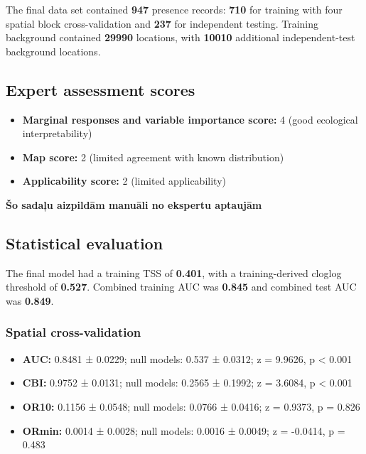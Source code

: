 \documentclass[
  openany]{book}
\providecommand{\tightlist}{%
  \setlength{\itemsep}{0pt}\setlength{\parskip}{0pt}}
\providecommand{\tightlist}{%
  \setlength{\itemsep}{0pt}%
  \setlength{\parskip}{0pt}%
}
\begin{document}
The final data set contained \textbf{947} presence records: \textbf{710} for training with four spatial block cross-validation and \textbf{237} for independent testing. Training background contained \textbf{29990} locations, with \textbf{10010} additional independent-test background locations.

\subsection*{Expert assessment scores}\label{expert-assessment-scores-11}

\begin{itemize}
\tightlist
\item
  \textbf{Marginal responses and variable importance score:} 4 (good ecological interpretability)
\item
  \textbf{Map score:} 2 (limited agreement with known distribution)
\item
  \textbf{Applicability score:} 2 (limited applicability)
\end{itemize}

\textbf{Šo sadaļu aizpildām manuāli no ekspertu aptaujām}

\subsection*{Statistical evaluation}\label{statistical-evaluation-11}

The final model had a training TSS of \textbf{0.401}, with a training-derived cloglog threshold of \textbf{0.527}. Combined training AUC was \textbf{0.845} and combined test AUC was \textbf{0.849}.

\subsubsection*{Spatial cross-validation}\label{spatial-cross-validation-11}

\begin{itemize}
\tightlist
\item
  \textbf{AUC:} 0.8481 ± 0.0229; null models: 0.537 ± 0.0312; z = 9.9626, p \textless{} 0.001
\item
  \textbf{CBI:} 0.9752 ± 0.0131; null models: 0.2565 ± 0.1992; z = 3.6084, p \textless{} 0.001
\item
  \textbf{OR10:} 0.1156 ± 0.0548; null models: 0.0766 ± 0.0416; z = 0.9373, p = 0.826
\item
  \textbf{ORmin:} 0.0014 ± 0.0028; null models: 0.0016 ± 0.0049; z = -0.0414, p = 0.483
\end{itemize}
\end{document}
